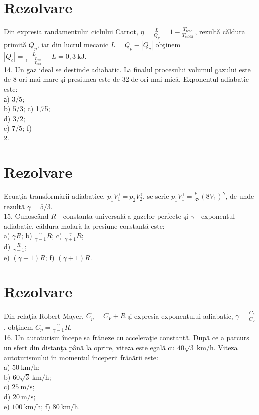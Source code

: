 \section*{Rezolvare}
Din expresia randamentului ciclului Carnot, $\eta=\frac{L}{Q_{p}}=1-\frac{T_{\text {rece }}}{T_{\text {caldă }}}$, rezultă căldura primită $Q_{p}$, iar din lucrul mecanic $L=Q_{p}-\left|Q_{c}\right|$ obţinem $\left|Q_{c}\right|=\frac{L}{1-\frac{T_{\text {rece }}}{T_{\text {cald }}}}-L=0,3 \mathrm{~kJ}$.\\
14. Un gaz ideal se destinde adiabatic. La finalul procesului volumul gazului este de 8 ori mai mare şi presiunea este de 32 de ori mai mică. Exponentul adiabatic este:\\
а) $3 / 5$;\\
b) 5/3; c) 1,75;\\
d) $3 / 2$;\\
e) $7 / 5$; f)\\
2.

\section*{Rezolvare}
Ecuaţia transformării adiabatice, $p_{1} V_{1}^{\gamma}=p_{2} V_{2}^{\gamma}$, se scrie $p_{1} V_{1}^{\gamma}=\frac{p_{1}}{32}\left(8 V_{1}\right)^{\gamma}$, de unde rezultă $\gamma=5 / 3$.\\
15. Cunoscând $R$ - constanta universală a gazelor perfecte şi $\gamma$ - exponentul adiabatic, căldura molară la presiune constantă este:\\
a) $\gamma R$; b) $\frac{\gamma}{\gamma-1} R$; c) $\frac{\gamma}{\gamma+1} R$;\\
d) $\frac{R}{\gamma-1}$;\\
e) $(\gamma-1) R$; f) $(\gamma+1) R$.

\section*{Rezolvare}
Din relaţia Robert-Mayer, $C_{p}=C_{V}+R$ şi expresia exponentului adiabatic, $\gamma=\frac{C_{p}}{C_{V}}$, obţinem $C_{p}=\frac{\gamma}{\gamma-1} R$.\\
16. Un autoturism începe sa frâneze cu acceleraţie constantă. După ce a parcurs un sfert din distanţa până la oprire, viteza este egală cu $40 \sqrt{3} \mathrm{~km} / \mathrm{h}$. Viteza autoturismului în momentul începerii frânării este:\\
a) $50 \mathrm{~km} / \mathrm{h}$;\\
b) $60 \sqrt{3} \mathrm{~km} / \mathrm{h}$;\\
c) $25 \mathrm{~m} / \mathrm{s}$;\\
d) $20 \mathrm{~m} / \mathrm{s}$;\\
e) $100 \mathrm{~km} / \mathrm{h}$; f) $80 \mathrm{~km} / \mathrm{h}$.

